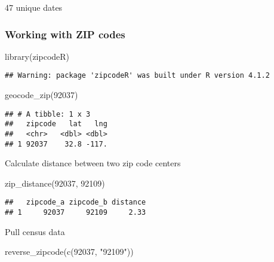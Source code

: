 \documentclass[
]{article}
\newenvironment{Shaded}{\begin{snugshade}}{\end{snugshade}}
\newcommand{\FunctionTok}[1]{\textcolor[rgb]{0.00,0.00,0.00}{#1}}
\newcommand{\NormalTok}[1]{#1}
\newcommand{\StringTok}[1]{\textcolor[rgb]{0.31,0.60,0.02}{#1}}
\begin{document}
47 unique dates

\hypertarget{working-with-zip-codes}{%
\subsubsection{Working with ZIP codes}\label{working-with-zip-codes}}

\begin{Shaded}
\begin{Highlighting}[]
\FunctionTok{library}\NormalTok{(zipcodeR)}
\end{Highlighting}
\end{Shaded}

\begin{verbatim}
## Warning: package 'zipcodeR' was built under R version 4.1.2
\end{verbatim}

\begin{Shaded}
\begin{Highlighting}[]
\FunctionTok{geocode\_zip}\NormalTok{(}\StringTok{\textquotesingle{}92037\textquotesingle{}}\NormalTok{)}
\end{Highlighting}
\end{Shaded}

\begin{verbatim}
## # A tibble: 1 x 3
##   zipcode   lat   lng
##   <chr>   <dbl> <dbl>
## 1 92037    32.8 -117.
\end{verbatim}

Calculate distance between two zip code centers

\begin{Shaded}
\begin{Highlighting}[]
\FunctionTok{zip\_distance}\NormalTok{(}\StringTok{\textquotesingle{}92037\textquotesingle{}}\NormalTok{, }\StringTok{\textquotesingle{}92109\textquotesingle{}}\NormalTok{)}
\end{Highlighting}
\end{Shaded}

\begin{verbatim}
##   zipcode_a zipcode_b distance
## 1     92037     92109     2.33
\end{verbatim}

Pull census data

\begin{Shaded}
\begin{Highlighting}[]
\FunctionTok{reverse\_zipcode}\NormalTok{(}\FunctionTok{c}\NormalTok{(}\StringTok{\textquotesingle{}92037\textquotesingle{}}\NormalTok{, }\StringTok{"92109"}\NormalTok{))}
\end{Highlighting}
\end{Shaded}
\end{document}
